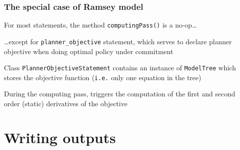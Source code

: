 \documentclass[aspectratio=169]{beamer}
\newenvironment{witemize}{\itemize\addtolength{\itemsep}{8pt}}{\enditemize}
\begin{document}
\begin{frame}
  \frametitle{The special case of Ramsey model}
  \begin{witemize}
  \item For most statements, the method \texttt{computingPass()} is a no-op\ldots
  \item \ldots except for \texttt{planner\_objective} statement, which serves to declare planner objective when doing optimal policy under commitment
  \item Class \texttt{PlannerObjectiveStatement} contains an instance of \texttt{ModelTree} which stores the objective function (\texttt{i.e.} only one equation in the tree)
  \item During the computing pass, triggers the computation of the first and second order (static) derivatives of the objective
  \end{witemize}
\end{frame}

\section{Writing outputs}
\end{document}
